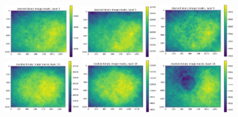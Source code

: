 \documentclass[letterpaper,11pt]{article}
\begin{document}
\begin{figure}[!ht]
\centering
\includegraphics[width=0.3\textwidth]{images/measuring_flatfield_corrections/mask_stack_layers_vectra/mask_stack_layer_1}
\includegraphics[width=0.3\textwidth]{images/measuring_flatfield_corrections/mask_stack_layers_vectra/mask_stack_layer_5}
\includegraphics[width=0.3\textwidth]{images/measuring_flatfield_corrections/mask_stack_layers_vectra/mask_stack_layer_9}
\includegraphics[width=0.3\textwidth]{images/measuring_flatfield_corrections/mask_stack_layers_vectra/mask_stack_layer_10}
\includegraphics[width=0.3\textwidth]{images/measuring_flatfield_corrections/mask_stack_layers_vectra/mask_stack_layer_14}
\includegraphics[width=0.3\textwidth]{images/measuring_flatfield_corrections/mask_stack_layers_vectra/mask_stack_layer_18}

\end{figure}
\end{document}
